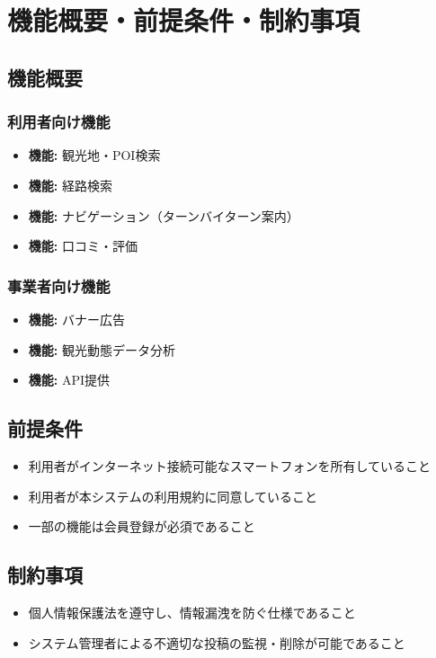 \documentclass[a4j, 11pt, report]{jsarticle}
\begin{document}
\section{機能概要・前提条件・制約事項}

\subsection{機能概要}
\subsubsection{利用者向け機能}
\begin{itemize}
    \item \textbf{機能:} 観光地・POI検索
    \item \textbf{機能:} 経路検索
    \item \textbf{機能:} ナビゲーション（ターンバイターン案内）
    \item \textbf{機能:} 口コミ・評価
\end{itemize}

\subsubsection{事業者向け機能}
\begin{itemize}
    \item \textbf{機能:} バナー広告
    \item \textbf{機能:} 観光動態データ分析
    \item \textbf{機能:} API提供
\end{itemize}

\subsection{前提条件}
\begin{itemize}
    \item 利用者がインターネット接続可能なスマートフォンを所有していること 
    \item 利用者が本システムの利用規約に同意していること
    \item 一部の機能は会員登録が必須であること
\end{itemize}

\subsection{制約事項}
\begin{itemize}
    \item 個人情報保護法を遵守し、情報漏洩を防ぐ仕様であること
    \item システム管理者による不適切な投稿の監視・削除が可能であること
\end{itemize}
\end{document}
